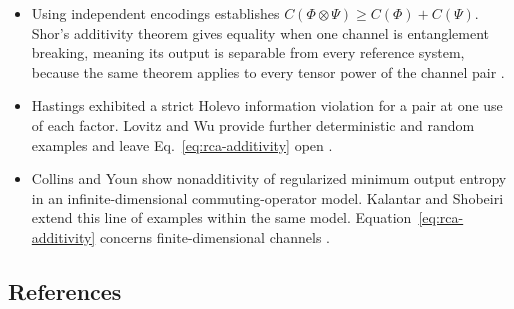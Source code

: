 \begin{itemize}
  \item Using independent encodings establishes $C(\Phi\otimes\Psi)\geq C(\Phi)+C(\Psi)$. Shor's additivity theorem gives equality when one channel is entanglement breaking, meaning its output is separable from every reference system, because the same theorem applies to every tensor power of the channel pair .

  \item Hastings exhibited a strict Holevo information violation for a pair at one use of each factor. Lovitz and Wu provide further deterministic and random examples and leave Eq.~\eqref{eq:rca-additivity} open  .

  \item Collins and Youn show nonadditivity of regularized minimum output entropy in an infinite-dimensional commuting-operator model. Kalantar and Shobeiri extend this line of examples within the same model. Equation~\eqref{eq:rca-additivity} concerns finite-dimensional channels  .
\end{itemize}

\subsection*{References}


